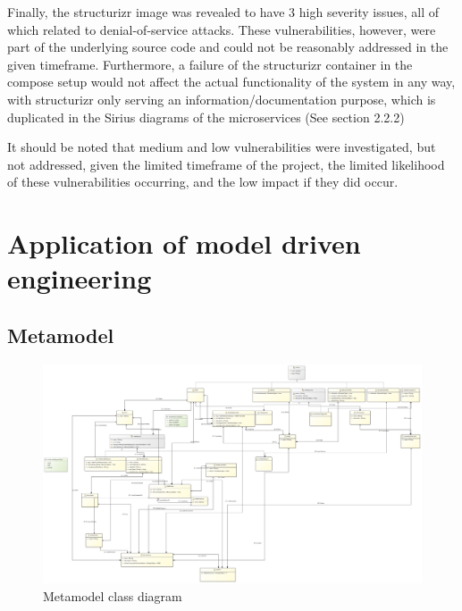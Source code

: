 \documentclass[parskip=full]{article}
\begin{document}
    Finally, the structurizr image was revealed to have 3 high severity issues, all of which related to denial-of-service attacks.
    These vulnerabilities, however, were part of the underlying source code and could not be reasonably addressed in the given timeframe.
    Furthermore, a failure of the structurizr container in the compose setup would not affect the actual functionality of the system in any way, with structurizr only serving an information/documentation purpose, which is duplicated in the Sirius diagrams of the microservices (See section 2.2.2)

    It should be noted that medium and low vulnerabilities were investigated, but not addressed, given the limited timeframe of the project, the limited likelihood of these vulnerabilities occurring, and the low impact if they did occur.


    \section{Application of model driven engineering}
    \subsection{Metamodel}
    \begin{figure}[h]
        \includegraphics[width=\textwidth]{metamodel-class-diagram}
        \caption{Metamodel class diagram}
        \label{fig:metamodelDiagram}
    \end{figure}
\end{document}
